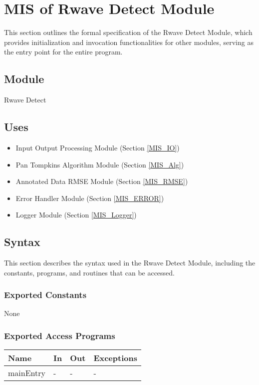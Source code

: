 \documentclass[12pt, titlepage]{article}
\begin{document}
\section{MIS of Rwave Detect Module} \label{MIS_Rwave}

This section outlines the formal specification of the Rwave Detect Module, which
provides initialization and invocation functionalities for other modules,
serving as the entry point for the entire program.

\subsection{Module}

Rwave Detect

\subsection{Uses}

\begin{itemize}
\item Input Output Processing Module (Section \ref{MIS_IO})
\item Pan Tompkins Algorithm Module (Section \ref{MIS_Alg})
\item Annotated Data RMSE Module (Section \ref{MIS_RMSE})
\item Error Handler Module (Section \ref{MIS_ERROR})
\item Logger Module (Section \ref{MIS_Logger})
\end{itemize}

\subsection{Syntax}

This section describes the syntax used in the Rwave Detect Module, including the
constants, programs, and routines that can be accessed.

\subsubsection{Exported Constants}

None

\subsubsection{Exported Access Programs}

\begin{center}
\begin{tabular}{p{2cm} p{4cm} p{4cm} p{2cm}}
\hline
\textbf{Name} & \textbf{In} & \textbf{Out} & \textbf{Exceptions} \\
\hline
mainEntry & - & - & - \\
\hline
\end{tabular}
\end{center}
\end{document}
